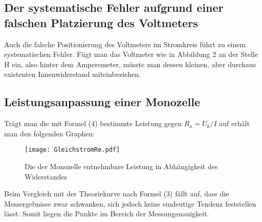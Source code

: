 \subsection{Der systematische Fehler aufgrund einer falschen Platzierung des Voltmeters}
Auch die falsche Positionierung des Voltmeters im Stromkreis führt zu einem
systematischen Fehler. Fügt man das Voltmeter wie in Abbildung 2 an der Stelle H
ein, also hinter dem Amperemeter, müsste man dessen kleinen, aber durchaus existenten
Innenwiderstand miteinbeziehen.

\newpage
\subsection{Leistungsanpassung einer Monozelle}
Trägt man die mit Formel (4) bestimmte Leistung gegen $R_a = U_k/I$ auf erhält man
den folgenden Graphen:
\begin{figure}[H]
	\centering
	\caption{Die der Monozelle entnehmbare Leistung in Abhängigkeit des Widerstandes}
	\texttt{[image: GleichstromRe.pdf]}
	\label{fig:GleichstromLeistung}
\end{figure}
Beim Vergleich mit der Theoriekurve nach Formel (3) fällt auf, dass die Messergebnisse zwar schwanken, sich jedoch keine eindeutige Tendenz feststellen lässt. Somit liegen die Punkte im Bereich der Messungenauigkeit.
